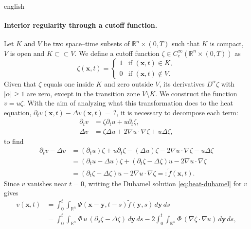 \documentclass[12pt,letterpaper,twoside]{book}
\newcommand{\abs}[1]{\left\lvert #1 \right\rvert}
\begin{document}
\begin{hyphenrules}{english}
\paragraph{Interior regularity through a cutoff function.}
Let $K$ and $V$ be two
space--time subsets of $\mathbb{R}^n\times(0,T)$ such that $K$ is compact, $V$ is open and $K\subset\subset V$.
We define a cutoff function $\zeta\in C_c^\infty(\mathbb{R}^n\times(0,T))$ as
\begin{equation}
  \zeta(\mathbf{x},t)=
  \begin{cases}
    1 & \text{if } (\mathbf{x},t)\in K,\\
    0 & \text{if } (\mathbf{x},t)\notin V.
  \end{cases}
  \label{eq:cutoff}
\end{equation}
Given that $\zeta$ equals one inside $K$ and zero outside $V$, its derivatives $D^\alpha\zeta$ with
$\abs{\alpha}\ge1$ are zero, except in the transition zone $V\setminus K$. We construct the function
$v=u\zeta$. With the aim of analyzing what this transformation does to the heat equation,
$\partial_t v(\mathbf{x},t)-\Delta v(\mathbf{x},t)=\,?$, it is necessary to decompose each term:
\begin{align}
  \partial_t v&=\zeta\partial_t u+u\partial_t\zeta, \label{eq:cut-dt}\\
  \Delta v&=\zeta\Delta u+2\nabla u\cdot\nabla\zeta+u\Delta\zeta, \label{eq:cut-lap}
\end{align}
to find
\begin{align}
  \partial_t v-\Delta v
    &=(\partial_t u)\zeta+u\partial_t\zeta-(\Delta u)\zeta-2\nabla u\cdot\nabla\zeta-u\Delta\zeta \label{eq:cut-1}\\
    &=(\partial_t u-\Delta u)\zeta+(\partial_t\zeta-\Delta\zeta)u-2\nabla u\cdot\nabla\zeta \label{eq:cut-2}\\
    &=(\partial_t\zeta-\Delta\zeta)u-2\nabla u\cdot\nabla\zeta=:\tilde f(\mathbf{x},t). \label{eq:cut-3}
\end{align}
Since $v$ vanishes near $t=0$, writing the Duhamel solution \eqref{eq:heat-duhamel} for $v$ gives
\begin{align}
  v(\mathbf{x},t)&=\int_0^t\!\!\int_{\mathbb{R}^n}\Phi(\mathbf{x}-\mathbf{y},t-s)\tilde f(\mathbf{y},s)\,d\mathbf{y}\,d s \label{eq:cut-4}\\
         &=\int_0^t\!\!\int_{\mathbb{R}^n}\Phi\,u\,(\partial_s\zeta-\Delta\zeta)\,d\mathbf{y}\,d s
           -2\int_0^t\!\!\int_{\mathbb{R}^n}\Phi\,(\nabla\zeta\cdot\nabla u)\,d\mathbf{y}\,d s, \label{eq:cut-5}

\end{align}
\end{hyphenrules}
\end{document}
